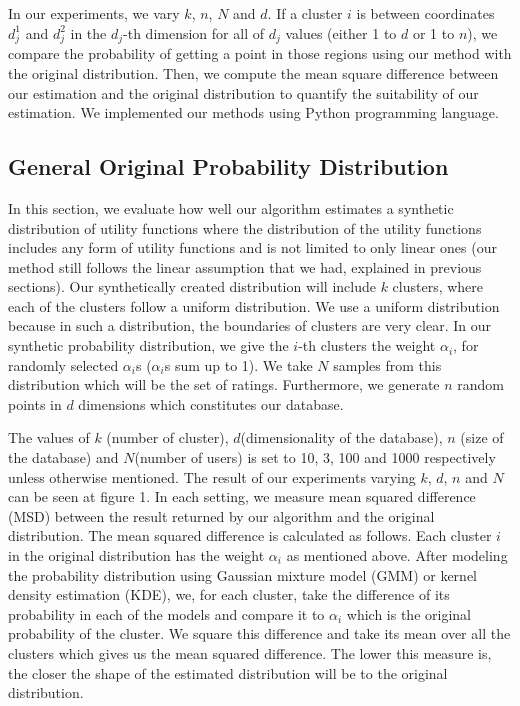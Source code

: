In our experiments, we vary $k$, $n$, $N$ and $d$. If a cluster $i$ is between coordinates $d_j^1$ and $d_j^2$ in the $d_j$-th dimension for all of $d_j$ values (either 1 to $d$ or 1 to $n$), we compare the probability of getting a point in those regions using our method with the original distribution. Then, we compute the mean square difference between our estimation and the original distribution to quantify the suitability of our estimation. We implemented our methods using Python programming language.

\subsection{General Original Probability Distribution}
In this section, we evaluate how well our algorithm estimates a synthetic distribution of utility functions where the distribution of the utility functions includes any form of utility functions and is not limited to only linear ones (our method still follows the linear assumption that we had, explained in previous sections). Our synthetically created distribution will include $k$ clusters, where each of the clusters follow a uniform distribution. We use a uniform distribution because in such a distribution, the boundaries of clusters are very clear. In our synthetic probability distribution, we give the $i$-th clusters the weight $\alpha_i$, for randomly selected $\alpha_i$s ($\alpha_i$s sum up to 1). We take $N$ samples from this distribution which will be the set of ratings. Furthermore, we generate $n$ random points in $d$ dimensions which constitutes our database. 

The values of $k$ (number of cluster), $d$(dimensionality of the database), $n$ (size of the database) and $N$(number of users) is set to 10, 3, 100 and 1000 respectively unless otherwise mentioned.  The result of our experiments varying $k$, $d$, $n$ and $N$ can be seen at figure 1. In each setting, we measure mean squared difference (MSD) between the result returned by our algorithm and the original distribution. The mean squared difference is calculated as follows. Each cluster $i$ in the original distribution has the weight $\alpha_i$ as mentioned above. After modeling the probability distribution using Gaussian mixture model (GMM) or kernel density estimation (KDE), we, for each cluster, take the difference  of its probability in each of the models and compare it to $\alpha_i$ which is the original probability of the cluster. We square this difference and take its mean over all the clusters which gives us the mean squared difference. The lower this measure is, the closer the shape of the estimated distribution will be to the original distribution. 

